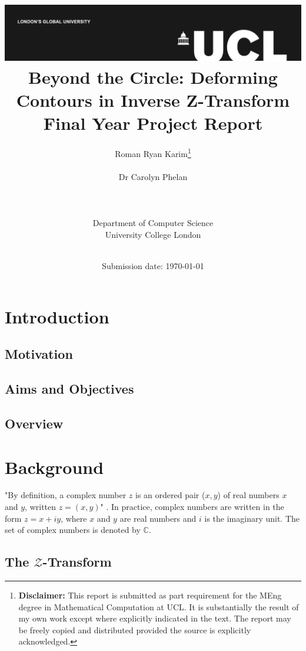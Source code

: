 \documentclass[a4paper]{report}
\title{{\vspace{-14em} \includegraphics[scale=0.4]{Logos/ucl_logo.png}}\\
{{\vspace{2em} \Huge Beyond the Circle: Deforming Contours in Inverse Z-Transform}}\\
{\large Final Year Project Report}\\
}
\date{Submission date: \today}
\author{Roman Ryan Karim\thanks{
{\bf Disclaimer:}
This report is submitted as part requirement for the MEng degree in Mathematical Computation at UCL. It is substantially the result of my own work except where explicitly indicated in the text. The report may be freely copied and distributed provided the source is explicitly acknowledged.}
\\ \\ Dr Carolyn Phelan
\\ \\ \\ \\ Department of Computer Science
\\ University College London
\\ \\
}
\begin{document}
 
\onehalfspacing
\maketitle
\begin{abstract}

\end{abstract}

\tableofcontents
\setcounter{page}{1}

\chapter{Introduction}
\section{Motivation}

\section{Aims and Objectives}

\section{Overview}

\chapter{Background}
"By definition, a complex number $z$ is an ordered pair ($x, y$) of real numbers $x$ and $y$, written $z = (x, y)$" \cite{kreyszig2010advanced}. In practice, complex numbers are written in the form $z = x + iy$, where $x$ and $y$ are real numbers and $i$ is the imaginary unit. The set of complex numbers is denoted by $\mathbb{C}$.


\section{The \texorpdfstring{$\mathcal{Z}$}{Lg}-Transform}
\end{document}
